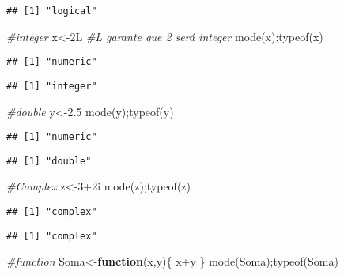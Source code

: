 \documentclass[
]{book}
\newenvironment{Shaded}{\begin{snugshade}}{\end{snugshade}}
\newcommand{\CommentTok}[1]{\textcolor[rgb]{0.56,0.35,0.01}{\textit{#1}}}
\newcommand{\ControlFlowTok}[1]{\textcolor[rgb]{0.13,0.29,0.53}{\textbf{#1}}}
\newcommand{\DecValTok}[1]{\textcolor[rgb]{0.00,0.00,0.81}{#1}}
\newcommand{\FloatTok}[1]{\textcolor[rgb]{0.00,0.00,0.81}{#1}}
\newcommand{\FunctionTok}[1]{\textcolor[rgb]{0.00,0.00,0.00}{#1}}
\newcommand{\NormalTok}[1]{#1}
\newcommand{\OtherTok}[1]{\textcolor[rgb]{0.56,0.35,0.01}{#1}}
\newcommand{\SpecialCharTok}[1]{\textcolor[rgb]{0.00,0.00,0.00}{#1}}
\begin{document}
\begin{verbatim}
## [1] "logical"
\end{verbatim}

\begin{Shaded}
\begin{Highlighting}[]
\CommentTok{\#integer}
\NormalTok{x}\OtherTok{\textless{}{-}}\NormalTok{2L }\CommentTok{\#L garante que 2 será integer}
\FunctionTok{mode}\NormalTok{(x);}\FunctionTok{typeof}\NormalTok{(x)}
\end{Highlighting}
\end{Shaded}

\begin{verbatim}
## [1] "numeric"
\end{verbatim}

\begin{verbatim}
## [1] "integer"
\end{verbatim}

\begin{Shaded}
\begin{Highlighting}[]
\CommentTok{\#double}
\NormalTok{y}\OtherTok{\textless{}{-}}\FloatTok{2.5}
\FunctionTok{mode}\NormalTok{(y);}\FunctionTok{typeof}\NormalTok{(y)}
\end{Highlighting}
\end{Shaded}

\begin{verbatim}
## [1] "numeric"
\end{verbatim}

\begin{verbatim}
## [1] "double"
\end{verbatim}

\begin{Shaded}
\begin{Highlighting}[]
\CommentTok{\#Complex}
\NormalTok{z}\OtherTok{\textless{}{-}}\DecValTok{3}\SpecialCharTok{+}\NormalTok{2i}
\FunctionTok{mode}\NormalTok{(z);}\FunctionTok{typeof}\NormalTok{(z)}
\end{Highlighting}
\end{Shaded}

\begin{verbatim}
## [1] "complex"
\end{verbatim}

\begin{verbatim}
## [1] "complex"
\end{verbatim}

\begin{Shaded}
\begin{Highlighting}[]
\CommentTok{\#function}
\NormalTok{Soma}\OtherTok{\textless{}{-}}\ControlFlowTok{function}\NormalTok{(x,y)\{}
\NormalTok{  x}\SpecialCharTok{+}\NormalTok{y}
\NormalTok{\}}
\FunctionTok{mode}\NormalTok{(Soma);}\FunctionTok{typeof}\NormalTok{(Soma)}
\end{Highlighting}
\end{Shaded}
\end{document}
